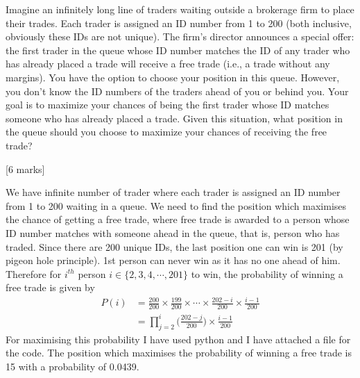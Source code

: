 \begin{que}
	 Imagine an infinitely long line of traders waiting outside a brokerage firm to place their trades. Each trader is assigned an ID number from 1 to 200 (both   
 inclusive, obviously these IDs are not unique). The firm’s director announces a special offer: the first trader in the queue whose ID number matches the ID of any 
 trader who has already placed a trade will receive a free trade (i.e., a trade without any margins). You have the option to choose your position in this queue.   
 However, you don’t know the ID numbers of the traders ahead of you or behind you. Your goal is to maximize your chances of being the first trader whose ID matches 
 someone who has already placed a trade. Given this situation, what position in the queue should you choose to maximize your chances of receiving the free trade?

	\hspace*{\fill} [6 marks]
\end{que}
\begin{tcolorbox}[breakable]
	\begin{sol}
		We have infinite number of trader where each trader is assigned an ID number from 1 to 200 waiting in a queue. We need to find the position which maximises the chance of getting a free trade, where free trade is awarded to a person whose ID number matches with someone ahead in the queue, that is, person who has traded. Since there are 200 unique IDs, the last position one can win is 201 (by pigeon hole principle). 1st person can never win as it has no one ahead of him. Therefore for $i^{th}$ person $i \in \{2,3,4,\cdots,201 \}$ to win, the probability of winning a free trade is given by
  \begin{align}      
P(i) &= \frac{200}{200} \times \frac{199}{200} \times \cdots \times \frac{202 - i}{200} \times \frac{i-1}{200} \\
     &= \prod_{j=2}^{i} \Bigg( \frac{202 - j}{200} \Bigg) \times \frac{i - 1}{200}
  \end{align}
For maximising this probability I have used python and I have attached a file for the code. The position which maximises the probability of winning a free trade is 15 with a probability of 0.0439.

	\end{sol}
\end{tcolorbox}
